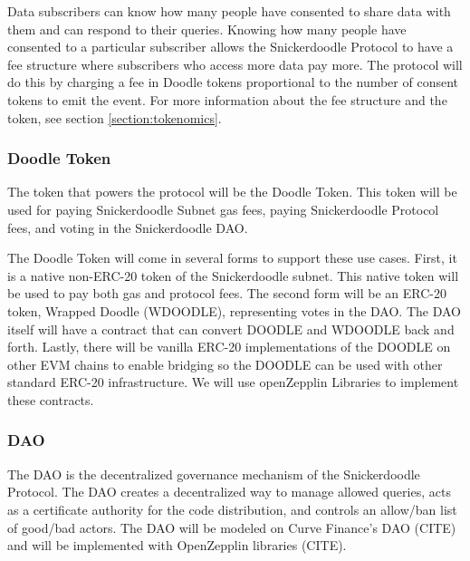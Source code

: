
Data subscribers can know how many people have consented to share data with them and can respond to their queries. Knowing how many people have consented to a particular subscriber allows the Snickerdoodle Protocol to have a fee structure where subscribers who access more data pay more. The protocol will do this by charging a fee in Doodle tokens proportional to the number of consent tokens to emit the event. For more information about the fee structure and the token, see section \ref{section:tokenomics}.

\subsubsection{Doodle Token}
\label{section:DoodleToken}
The token that powers the protocol will be the Doodle Token. This token will be used for paying Snickerdoodle Subnet gas fees, paying Snickerdoodle Protocol fees, and voting in the Snickerdoodle DAO. 

The Doodle Token will come in several forms to support these use cases. First, it is a native non-ERC-20 token of the Snickerdoodle subnet. This native token will be used to pay both gas and protocol fees. The second form will be an ERC-20 token, Wrapped Doodle (WDOODLE), representing votes in the DAO. The DAO itself will have a contract that can convert DOODLE and WDOODLE back and forth. Lastly, there will be vanilla ERC-20 implementations of the DOODLE on other EVM chains to enable bridging so the DOODLE can be used with other standard ERC-20 infrastructure. We will use openZepplin Libraries to implement these contracts. 


\subsubsection{DAO}
\label{section:ImplementationDAO}
The DAO is the decentralized governance mechanism of the Snickerdoodle Protocol. The DAO creates a decentralized way to manage allowed queries, acts as a certificate authority for the code distribution, and controls an allow/ban list of good/bad actors. The DAO will be modeled on Curve Finance's DAO (CITE) and will be implemented with OpenZepplin libraries (CITE). 

